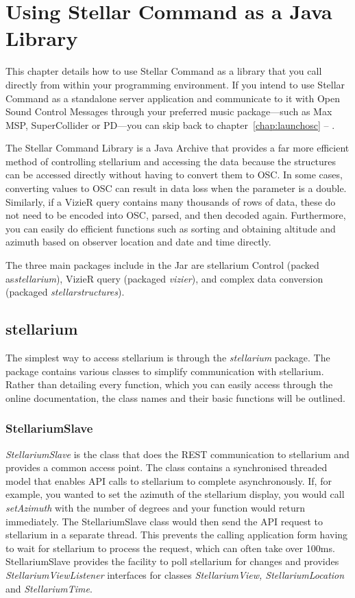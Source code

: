 \chapter{Using Stellar Command as a Java Library} \label{chap:libraryosc}
This chapter details how to use Stellar Command as a library that you call directly from within your programming environment.
If you intend to use Stellar Command as a standalone server application and communicate to it with Open Sound Control Messages through your preferred music package---such as Max MSP, SuperCollider or PD---you can skip back to chapter~\ref{chap:launchosc} --
\emph{}.

The Stellar Command Library is a Java Archive that provides a far more efficient method of controlling stellarium and accessing the data because the structures can be accessed directly without having to convert them to OSC. In some cases, converting values to OSC  can result in  data loss when the parameter is a double. Similarly, if a VizieR query contains many thousands of rows of data, these do not need to be encoded into OSC, parsed, and then decoded again. Furthermore, you can easily do efficient functions such as sorting and obtaining altitude and azimuth based on observer location and date and time directly.

The three main packages include in the Jar are stellarium Control (packed as\textit{stellarium}), VizieR query (packaged \textit{vizier}), and complex data conversion (packaged \textit{stellarstructures}).

\section{stellarium}
The simplest way to access stellarium is through the \textit{stellarium} package. The package contains various classes to simplify communication with stellarium. Rather than detailing every function, which you can easily access through the online documentation, the class names and their basic functions will be outlined.
\subsection{StellariumSlave}

\textit{StellariumSlave} is the class that does the REST communication to stellarium and provides a common access point. The class contains a synchronised threaded model that enables API calls to stellarium to complete asynchronously. If, for example, you wanted to set the azimuth of the stellarium display, you would call \textit{setAzimuth} with the number of degrees and your function would return immediately. The StellariumSlave class would then send the API request to stellarium in a separate thread. This prevents the calling application form having to wait for stellarium to process the request, which can often take over 100ms.
StellariumSlave provides the facility to poll stellarium for changes and provides \textit{StellariumViewListener} interfaces for classes \textit{StellariumView, StellariumLocation} and \textit{StellariumTime}.


